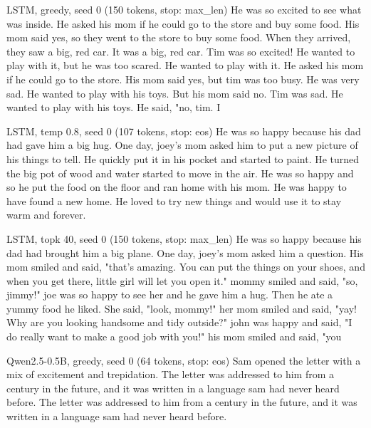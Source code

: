 \begin{modelout}{LSTM, greedy, seed 0 (150 tokens, stop: max\_len)}
\small He was so excited to see what was inside. He asked his mom if he could go to the store and buy some food. His mom said yes, so they went to the store to buy some food. When they arrived, they saw a big, red car. It was a big, red car. Tim was so excited! He wanted to play with it, but he was too scared. He wanted to play with it. He asked his mom if he could go to the store. His mom said yes, but tim was too busy. He was very sad. He wanted to play with his toys. But his mom said no. Tim was sad. He wanted to play with his toys. He said, "no, tim. I
\end{modelout}

\begin{modelout}{LSTM, temp 0.8, seed 0 (107 tokens, stop: eos)}
\small He was so happy because his dad had gave him a big hug. One day, joey's mom asked him to put a new picture of his things to tell. He quickly put it in his pocket and started to paint. He turned the big pot of wood and water started to move in the air. He was so happy and so he put the food on the floor and ran home with his mom. He was happy to have found a new home. He loved to try new things and would use it to stay warm and forever.
\end{modelout}

\begin{modelout}{LSTM, topk 40, seed 0 (150 tokens, stop: max\_len)}
\small He was so happy because his dad had brought him a big plane. One day, joey's mom asked him a question. His mom smiled and said, "that's amazing. You can put the things on your shoes, and when you get there, little girl will let you open it." mommy smiled and said, "so, jimmy!" joe was so happy to see her and he gave him a hug. Then he ate a yummy food he liked. She said, "look, mommy!" her mom smiled and said, "yay! Why are you looking handsome and tidy outside?" john was happy and said, "I do really want to make a good job with you!" his mom smiled and said, "you
\end{modelout}

\begin{modelout}{Qwen2.5-0.5B, greedy, seed 0 (64 tokens, stop: eos)}
\small Sam opened the letter with a mix of excitement and trepidation. The letter was addressed to him from a century in the future, and it was written in a language sam had never heard before. The letter was addressed to him from a century in the future, and it was written in a language sam had never heard before.
\end{modelout}


